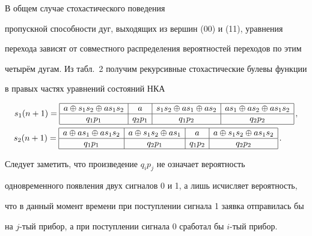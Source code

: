 \smallskip



 В общем случае стохастического поведения

пропускной способности дуг, выходящих из вершин (00) и (11), уравнения

перехода зависят от совместного распределения вероятностей переходов по этим

четырём дугам. Из табл.~2 получим рекурсивные стохастические булевы функции

в правых частях уравнений состояний НКА

\begin{gather*}

s_1 ( n+1 )=\begin{array}{|c|c|c|c|} \hline

a\oplus s_1 s_2 \oplus as_1 s_2  & a & s_1 s_2 \oplus as_1

\oplus as_2  & as_1 \oplus as_2 \oplus as_1 s_2  \\ \hline

q_1 p_1  & q_2 p_1  &  q_1 p_2  & q_2 p_2  \\ \hline

\end{array}\,,\\

s_2 (n+1)=\begin{array}{|c|c|c|c|} \hline

a\oplus as_1 \oplus as_1 s_2  &  a\oplus s_1 s_2 \oplus as_1 & a  & a\oplus s_1 s_2 \oplus as_1 s_2  \\ \hline

q_1 p_1  & q_2 p_1  & q_1 p_2  & q_2 p_2  \\ \hline

\end{array} \,. \hspace{7mm}

\end{gather*}



Следует заметить, что произведение $q_i p_j$ не означает вероятность

одновременного появления двух сигналов 0 и 1, а лишь исчисляет вероятность,

что в данный момент времени при поступлении сигнала 1 заявка отправилась бы

на $j$-тый прибор, а при поступлении сигнала 0 сработал бы $i$-тый прибор.



